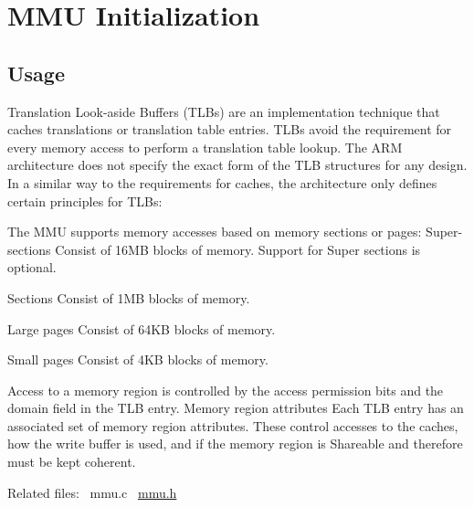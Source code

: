 \hypertarget{group__mmu}{}\section{M\+MU Initialization}
\label{group__mmu}
\hypertarget{group__RTEMSBSPsARM_Usage}{}\subsection{Usage}\label{group__RTEMSBSPsARM_Usage}
Translation Look-\/aside Buffers (T\+L\+Bs) are an implementation technique that caches translations or translation table entries. T\+L\+Bs avoid the requirement for every memory access to perform a translation table lookup. The A\+RM architecture does not specify the exact form of the T\+LB structures for any design. In a similar way to the requirements for caches, the architecture only defines certain principles for T\+L\+Bs\+:

The M\+MU supports memory accesses based on memory sections or pages\+: Super-\/sections Consist of 16MB blocks of memory. Support for Super sections is optional.
\begin{DoxyEnumerate}
\item Sections Consist of 1MB blocks of memory.
\item Large pages Consist of 64KB blocks of memory.
\item Small pages Consist of 4KB blocks of memory.
\end{DoxyEnumerate}

Access to a memory region is controlled by the access permission bits and the domain field in the T\+LB entry. Memory region attributes Each T\+LB entry has an associated set of memory region attributes. These control accesses to the caches, how the write buffer is used, and if the memory region is Shareable and therefore must be kept coherent.

Related files\+:~\newline
mmu.\+c~\newline
 \mbox{\hyperlink{sparc64_2include_2arch_2mm_2sun4u_2mmu_8h}{mmu.\+h}} ~\newline
